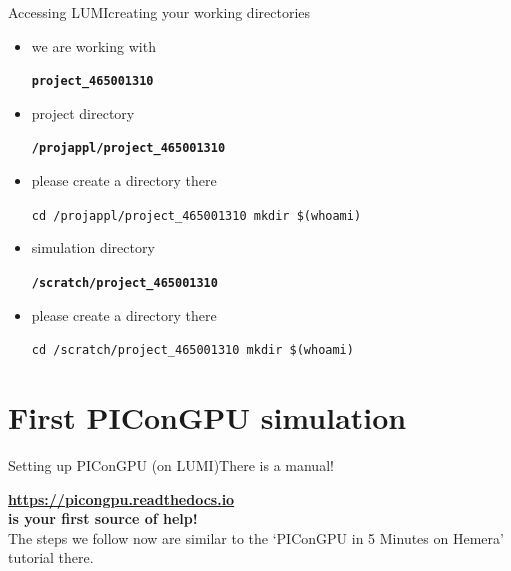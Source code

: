 \documentclass[
  aspectratio=169,
  10pt
]{beamer}
\newcommand{\terminal}[1]{\par\noindent\colorbox{shadecolor}
{\parbox{\dimexpr\textwidth-2\fboxsep\relax}{\texttt{#1}}}}
\begin{document}
\begin{frame}[t,fragile]{Accessing LUMI}{creating your working directories}

\begin{itemize}
    \item we are working with \begin{center}\textbf{\texttt{project\_465001310}}\end{center}
    \item project directory \begin{center}\textbf{\texttt{/projappl/project\_465001310}}\end{center}
    \item please create a directory there \terminal{cd /projappl/project\_465001310 \newline mkdir \$(whoami)}
    \item simulation directory \begin{center}\textbf{\texttt{/scratch/project\_465001310}}\end{center}
    \item please create a directory there \terminal{cd /scratch/project\_465001310 \newline mkdir \$(whoami)}    
\end{itemize}

\end{frame}






\part{First PIConGPU simulation}
\frame{\partpage}

\begin{frame}[t,fragile]{Setting up PIConGPU (on LUMI)}{There is a manual!}
\begin{center}
    {\Large
    \vspace{1\baselineskip}
    \textcolor{hz-blue}{\textbf{   \url{https://picongpu.readthedocs.io}   }}\\
    \vspace{1\baselineskip}
    \textbf{is your first source of help!}\\
    \vspace{1\baselineskip}}
    {\large The steps we follow now are similar to the `PIConGPU in 5 Minutes on Hemera' tutorial there.}
\end{center}

\end{frame}
\end{document}
